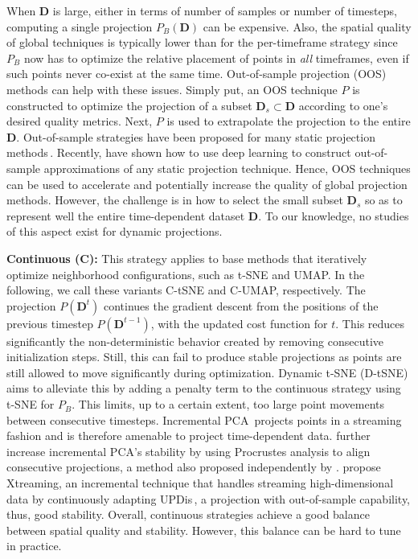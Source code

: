 When $\mathbf{D}$ is large, either in terms of number of samples or number of timesteps, computing a single projection $P_B(\mathbf{D})$ can be expensive. Also, the spatial quality of global techniques is typically lower than for the per-timeframe strategy since $P_B$ now has to optimize the relative placement of points in \emph{all} timeframes, even if such points never co-exist at the same time. Out-of-sample projection (OOS) methods can help with these issues. Simply put, an OOS technique $P$ is constructed to optimize the projection of a subset $\mathbf{D}_s \subset \mathbf{D}$ according to one's desired quality metrics. Next, $P$ is used to extrapolate the projection to the entire $\mathbf{D}$. Out-of-sample strategies have been proposed for many static projection methods\,\citep{oos}. Recently, \cite{MateusEspadoto} have shown how to use deep learning to construct out-of-sample approximations of any static projection technique. Hence, OOS techniques can be used to accelerate and potentially increase the quality of global projection methods. However, the challenge is in how to select the small subset $\mathbf{D}_s$ so as to represent well the entire time-dependent dataset $\mathbf{D}$. To our knowledge, no studies of this aspect exist for dynamic projections.

\noindent\textbf{Continuous (C):} This strategy applies to base methods that iteratively optimize neighborhood configurations, such as t-SNE and UMAP. In the following, we call these variants C-tSNE and C-UMAP, respectively. The projection $P(\mathbf{D}^{t})$ continues the gradient descent from the positions of the previous timestep $P(\mathbf{D}^{t-1})$, with the updated cost function for $t$. This reduces significantly the non-deterministic behavior created by removing consecutive initialization steps. Still, this can fail to produce stable projections as points are still allowed to move significantly during optimization. Dynamic t-SNE (D-tSNE)\,\citep{Rauber2016} aims to alleviate this by adding a penalty term to the continuous strategy using t-SNE for $P_B$. This limits, up to a certain extent, too large point movements between consecutive timesteps.
Incremental PCA\,\citep{ross08} projects points in a streaming fashion and is therefore amenable to project time-dependent data. \cite{Fujiwara2020} further increase incremental PCA's stability by using Procrustes analysis to align consecutive projections, a method also proposed independently by \cite{Joia2011}. \cite{Neves2020} propose Xtreaming, an incremental technique that handles streaming high-dimensional data by continuously adapting UPDis\,\citep{updis}, a projection with out-of-sample capability, thus, good stability. Overall, continuous strategies achieve a good balance between spatial quality and stability. However, this balance can be hard to tune in practice. 

